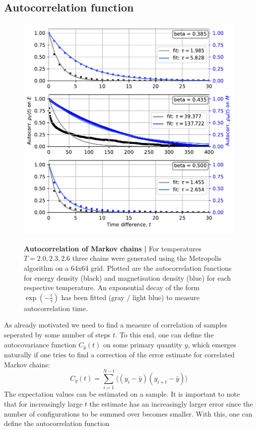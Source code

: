 \documentclass[11pt, a4paper]{scrartcl}
\begin{document}
\subsection{Autocorrelation function}
    \begin{figure}
        \includegraphics{autocorrelations.pdf}
        \label{fig1}
        \caption{\textbf{Autocorrelation of Markov chains |}  For temperatures $T = 2.0, 2.3, 2.6$ three chains were generated using the Metropolis algorithm on a 64x64 grid. Plotted are the autocorrelation functions for energy density (black) and magnetisation density (blue) for each respective temperature. An exponential decay of the form $\exp(-\frac{t}{\tau})$ has been fitted (gray / light blue) to measure autocorrelation time.}
    \end{figure}
    As already motivated we need to find a measure of correlation of samples seperated by some number of steps $t$. To this end, one can define the autocovariance function $C_y(t)$ on some primary quantity $y$, which emerges naturally if one tries to find a correction of the error estimate for correlated Markov chains:
    $$C_y(t) = \sum_{i = 1}^{N-t} \langle (y_i - \bar{y})(y_{i+t} - \bar{y}) \rangle$$
    The expectation values can be estimated on a sample. It is important to note that for increasingly large $t$ the estimate has an increasingly larger error since the number of configurations to be summed over becomes smaller. With this, one can define the autocorrelation function
\end{document}
